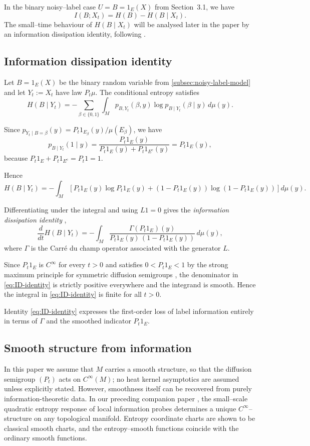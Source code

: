 \documentclass[11pt]{amsart}
\theoremstyle{definition}
\theoremstyle{remark}
\begin{document}
In the binary noisy--label case $U=B=1_E(X)$ from Section~3.1, we have
\[
I(B;X_t) = H(B) - H(B\mid X_t).
\]
The small--time behaviour of $H(B\mid X_t)$ will be analysed later in the paper by an
information dissipation identity, following \cite{Sangha2025Isoperimetry}.

\subsection{Information dissipation identity}
Let $B = 1_E(X)$ be the binary random variable from \ref{subsec:noisy-label-model} and let $Y_t := X_t$ have law $P_t\mu$.
The conditional entropy satisfies
\[
H(B\mid Y_t)
= - \sum_{\beta\in\{0,1\}} \int_M p_{B,Y_t}(\beta,y)
    \log p_{B\mid Y_t}(\beta\mid y)\, d\mu(y).
\]

Since $p_{Y_t\mid B=\beta}(y) = P_t1_{E_\beta}(y)/\mu(E_\beta)$, we have
\[
p_{B\mid Y_t}(1\mid y)
= \frac{P_t 1_E(y)}{P_t 1_E(y) + P_t 1_{E^c}(y)}
= P_t 1_E(y),
\]
because $P_t 1_E + P_t 1_{E^c} = P_t 1 = 1$.

Hence
\[
H(B\mid Y_t)
= -\int_M\!\left[
P_t 1_E(y)\log P_t 1_E(y) + (1-P_t 1_E(y))\log(1-P_t 1_E(y))
\right] d\mu(y).
\]

Differentiating under the integral and using $L1=0$ gives the
\emph{information dissipation identity} \cite{Sangha2025Isoperimetry},
\begin{equation}\label{eq:ID-identity}
\frac{d}{dt}H(B\mid Y_t)
= - \int_M 
     \frac{\Gamma(P_t 1_E)(y)}
          {P_t 1_E(y)\, (1 - P_t 1_E(y))}
     \, d\mu(y),
\end{equation}
where $\Gamma$ is the Carré du champ operator associated with the generator $L$.

Since $P_t1_E$ is $C^\infty$ for every $t>0$ \cite{BakryGentilLedoux2014, FukushimaOshimaTakeda2011} and satisfies $0<P_t1_E<1$ by the strong maximum
principle for symmetric diffusion semigroups \cite{FriedmanParabolicPDE}, the denominator in
\eqref{eq:ID-identity} is strictly positive everywhere and the integrand is smooth. Hence the
integral in \eqref{eq:ID-identity} is finite for all $t>0$.


Identity \eqref{eq:ID-identity} expresses the first-order loss of label information entirely in
terms of $\Gamma$ and the smoothed indicator $P_t 1_E$.

\subsection{Smooth structure from information} 
In this paper we assume that $M$ carries a smooth structure, so that the
diffusion semigroup $(P_t)$ acts on $C^\infty(M)$; no heat kernel asymptotics are assumed unless explicitly stated. However, smoothness itself can be recovered from
purely information-theoretic data.  In our preceding companion paper \cite{SanghaEntropySmooth},
the small--scale quadratic entropy response of local information probes
determines a unique $C^\infty$--structure on any topological manifold.
Entropy coordinate charts are shown to be classical smooth charts, and the
entropy--smooth functions coincide with the ordinary smooth functions.
\end{document}
